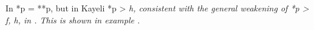 In  *p = **p,
but in Kayeli *p > \it{h},
consistent with the general weakening of *p > \it{f,
h,} {\0} in .
This is shown in example .
%

